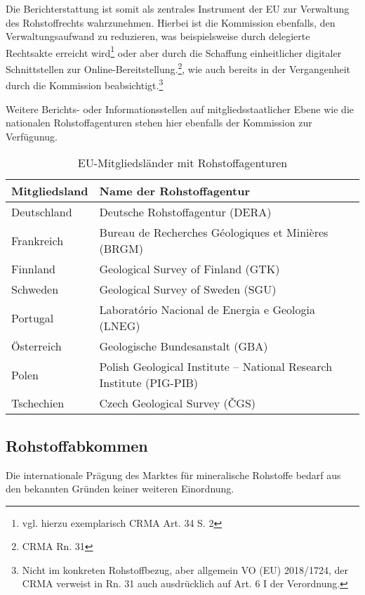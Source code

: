\documentclass[12pt,a4paper,oneside]{book} %
\begin{document}
	Die Berichterstattung ist somit als zentrales Instrument der EU zur Verwaltung des Rohstoffrechts wahrzunehmen. Hierbei ist die Kommission ebenfalls, den Verwaltungsaufwand zu reduzieren, was beispielsweise durch delegierte Rechtsakte erreicht wird\footnote{vgl. hierzu exemplarisch CRMA Art. 34 S. 2} oder aber durch die Schaffung einheitlicher digitaler Schnittstellen zur Online-Bereitstellung.\footnote{CRMA Rn. 31}, wie auch bereits in der Vergangenheit durch die Kommission beabsichtigt.\footnote{Nicht im konkreten Rohstoffbezug, aber allgemein VO (EU) 2018/1724, der CRMA verweist in Rn. 31 auch ausdrücklich auf Art. 6 I der Verordnung.}
	
	Weitere Berichts- oder Informationsstellen auf mitgliedsstaatlicher Ebene wie die nationalen Rohstoffagenturen stehen hier ebenfalls der Kommission zur Verfügunug.
	\begin{table}[h!]
		\centering
		\begin{tabular}{|l|l|}
			\hline
			\textbf{Mitgliedsland} & \textbf{Name der Rohstoffagentur} \\ \hline
			Deutschland            & Deutsche Rohstoffagentur (DERA) \\ \hline
			Frankreich             & Bureau de Recherches Géologiques et Minières (BRGM) \\ \hline
			Finnland               & Geological Survey of Finland (GTK) \\ \hline
			Schweden               & Geological Survey of Sweden (SGU) \\ \hline
			Portugal               & Laboratório Nacional de Energia e Geologia (LNEG) \\ \hline
			Österreich             & Geologische Bundesanstalt (GBA) \\ \hline
			Polen                  & Polish Geological Institute – National Research Institute (PIG-PIB) \\ \hline
			Tschechien             & Czech Geological Survey (ČGS) \\ \hline
		\end{tabular}
		\caption{EU-Mitgliedsländer mit Rohstoffagenturen}
		\label{tab:rohstoffagenturen}
	\end{table}
	
	
	
	
\subsection{Rohstoffabkommen}
Die internationale Prägung des Marktes für mineralische Rohstoffe bedarf aus den bekannten Gründen keiner weiteren Einordnung.
\end{document}
